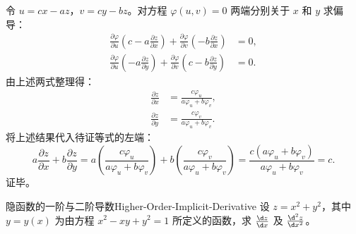\begin{myproof}
    令 $u = cx - az$，$v = cy - bz$。对方程 $\varphi(u, v) = 0$ 两端分别关于 $x$ 和 $y$ 求偏导：
    \begin{equation}
        \begin{aligned}
            \frac{\partial \varphi}{\partial u} \left( c - a \frac{\partial z}{\partial x} \right) + \frac{\partial \varphi}{\partial v} \left( -b \frac{\partial z}{\partial x} \right) & = 0, \\
            \frac{\partial \varphi}{\partial u} \left( -a \frac{\partial z}{\partial y} \right) + \frac{\partial \varphi}{\partial v} \left( c - b \frac{\partial z}{\partial y} \right) & = 0.
        \end{aligned}
    \end{equation}
    由上述两式整理得：
    \begin{equation}
        \begin{aligned}
            \frac{\partial z}{\partial x} & = \frac{c \varphi_u}{a \varphi_u + b \varphi_v}, \\
            \frac{\partial z}{\partial y} & = \frac{c \varphi_v}{a \varphi_u + b \varphi_v}.
        \end{aligned}
    \end{equation}
    将上述结果代入待证等式的左端：
    \begin{equation}
        a \frac{\partial z}{\partial x} + b \frac{\partial z}{\partial y} = a \left( \frac{c \varphi_u}{a \varphi_u + b \varphi_v} \right) + b \left( \frac{c \varphi_v}{a \varphi_u + b \varphi_v} \right) = \frac{c(a \varphi_u + b \varphi_v)}{a \varphi_u + b \varphi_v} = c.
    \end{equation}
    证毕。
\end{myproof}

\begin{problem}{隐函数的一阶与二阶导数}{Higher-Order-Implicit-Derivative}
    设 $z = x^2 + y^2$，其中 $y = y(x)$ 为由方程 $x^2 - xy + y^2 = 1$ 所定义的函数，求 $\frac{\d z}{\d x}$ 及 $\frac{\d^2 z}{\d x^2}$。
\end{problem}

